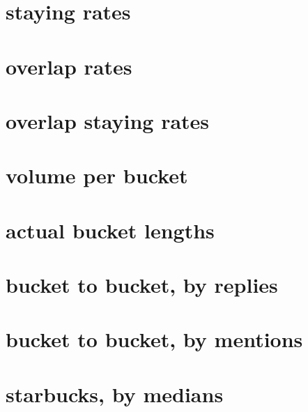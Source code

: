 \section{staying rates}
\pagebreak

\section{overlap rates}
\pagebreak

\section{overlap staying rates}
\pagebreak

\section{volume per bucket}
\pagebreak

\section{actual bucket lengths}
\pagebreak

\section{bucket to bucket, by replies}
\pagebreak

\section{bucket to bucket, by mentions}
\pagebreak

\section{starbucks, by medians}
\pagebreak

%
